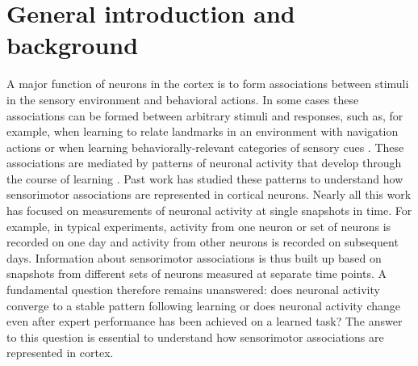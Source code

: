 \chapter{General introduction and background}
A major function of neurons in the cortex is to form associations between stimuli in the sensory environment and behavioral actions. In some cases these associations can be formed between arbitrary stimuli and responses, such as, for example, when learning to relate landmarks in an environment with navigation actions or when learning behaviorally-relevant categories of sensory cues \citep{Freedman2016,Harvey:2012du}. These associations are mediated by patterns of neuronal activity that develop through the course of learning \citep{Freedman2006}. Past work has studied these patterns to understand how sensorimotor associations are represented in cortical neurons. Nearly all this work has focused on measurements of neuronal activity at single snapshots in time. For example, in typical experiments, activity from one neuron or set of neurons is recorded on one day and activity from other neurons is recorded on subsequent days. Information about sensorimotor associations is thus built up based on snapshots from different sets of neurons measured at separate time points. A fundamental question therefore remains unanswered: does neuronal activity converge to a stable pattern following learning or does neuronal activity change even after expert performance has been achieved on a learned task? The answer to this question is essential to understand how sensorimotor associations are represented in cortex.

\bigskip


